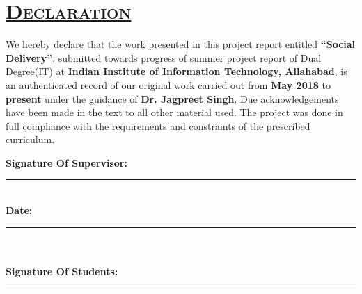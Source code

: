 \documentclass{report}
\begin{document}
\pagebreak


{\chapter*{ \quad \quad \quad \quad \quad \quad  \Huge \scshape \underline {Declaration} }
\vspace{2.0cm}
\begin{spacing}{0.3}
\fontsize{17}{68}\selectfont\linespread{10} {We hereby declare that the work presented in this project report entitled \textbf{``Social Delivery''},  submitted towards progress of summer project report of Dual Degree(IT) at \textbf{Indian Institute of Information Technology, Allahabad}, is an authenticated record of our original work carried out from \textbf{May 2018} to \textbf{present} under the guidance of \textbf{Dr. Jagpreet Singh}. Due acknowledgements have been made in the text to all other material used. The project was done in full compliance with the requirements and constraints of the prescribed curriculum.}
\end{spacing}
\vspace{5cm}
\Large
\noindent \textbf{Signature Of Supervisor:}\\
\rule[0.5em]{25em}{0.5pt} %
\vspace{1cm}\\
\noindent \textbf{Date:}\\
\rule[0.5em]{25em}{0.5pt}\\ %
\vspace{1cm}\\
\noindent \textbf{Signature Of Students:}\\
\rule[0.5em]{12em}{0.5pt} %
\vspace{1.5cm}\\

}



{ \doublespacing
{}
\tableofcontents %

\pagebreak
\listoffigures %
\pagebreak
\listoftables %
\pagebreak

}
\end{document}
